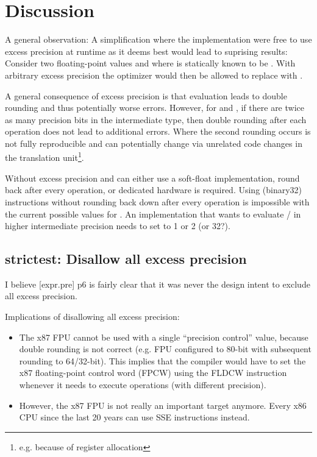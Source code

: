 \section{Discussion}

A general observation:
A simplification where the implementation were free to use excess precision at
runtime as it deems best would lead to suprising results:
Consider two floating-point values  and  where
 is statically known to be .
With arbitrary excess precision the optimizer would then be allowed to replace
 with .

A general consequence of excess precision is that \fp evaluation leads to
double rounding and thus potentially worse errors.
However, for \code{+-*/} and , if there are twice as many precision
bits in the intermediate type, then double rounding after each operation does
not lead to additional errors.
Where the second rounding occurs is not fully reproducible and can potentially
change via unrelated code changes in the translation unit\footnote{e.g. because of register allocation}.

Without excess precision  and  can
either use a soft-float implementation, round back after every 
operation, or dedicated hardware is required.
Using \float (binary32) instructions without rounding back down after every
operation is impossible with the current possible values for
.
An implementation that wants to evaluate \std{} /
\std{} in higher intermediate precision needs to set
 to 1 or 2 (or 32?).

\subsection{strictest: Disallow all excess precision}\label{d:1}

I believe [expr.pre] p6 is fairly clear that it was never the design intent to
exclude all excess precision.

Implications of disallowing all excess precision:
\begin{itemize}
  \item The x87 FPU cannot be used with a single “precision control” value,
    because double rounding is not correct (e.g. FPU configured to 80-bit with
    subsequent rounding to 64/32-bit).
    This implies that the compiler would have to set the x87 floating-point
    control word (FPCW) using the FLDCW instruction whenever it needs to
    execute \fp operations (with different precision).

  \item However, the x87 FPU is not really an important target anymore. Every x86
    CPU since the last 20 years can use SSE instructions instead.
\end{itemize}

